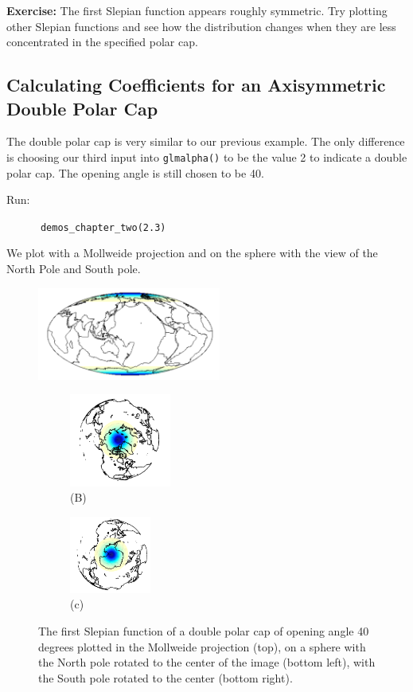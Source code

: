 \documentclass[11pt]{article}
\begin{document}
\textbf{Exercise:} The first Slepian function appears roughly symmetric. Try plotting other Slepian functions and see how the distribution changes when they are less concentrated in the specified polar cap.

\subsection{Calculating Coefficients for an Axisymmetric Double Polar Cap}

The double polar cap is very similar to our previous example. The only difference is choosing our third input into \verb|glmalpha()| to be the value 2 to indicate a double polar cap. The opening angle is still chosen to be 40. 

Run:

\verb|		demos_chapter_two(2.3)|

We plot with a Mollweide projection and on the sphere with the view of the North Pole and South pole. 

\begin{figure}[t!]
    \centering
        \includegraphics[height=1.2in]{figures/figure3A.png}     
        \begin{subfigure}[t]{0.5\textwidth}
        \centering
        \includegraphics[height=1.2in]{figures/figure3B.png}
        \caption{(B)}
    \end{subfigure}
    \begin{subfigure}[t]{0.5\textwidth}
    	\centering
    	\includegraphics[height=1.0in]{figures/figure3C.png}
    	\caption{(c)}
    \end{subfigure}
    \caption{The first Slepian function of a double polar cap of opening angle 40 degrees plotted in the Mollweide projection (top), on a sphere with the North pole rotated to the center of the image (bottom left), with the South pole rotated to the center (bottom right).}
\end{figure}
\end{document}
